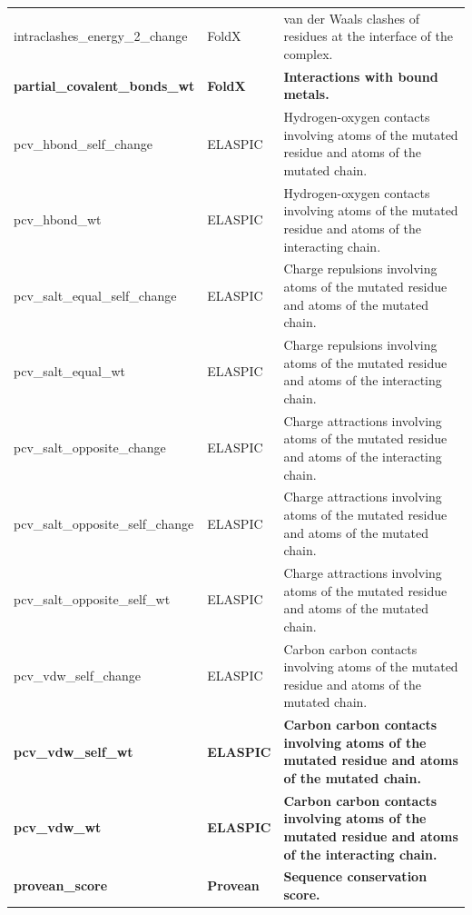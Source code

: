 \begin{table}[tb]
\begin{tabular}{ l | l | p{8cm} }
		intraclashes\_energy\_2\_change       & FoldX            & van der Waals clashes of residues at the interface of the complex.                                         \\
		\textbf{partial\_covalent\_bonds\_wt} & \textbf{FoldX}   & \textbf{Interactions with bound metals.}                                                                   \\
		pcv\_hbond\_self\_change              & ELASPIC          & Hydrogen-oxygen contacts involving atoms of the mutated residue and atoms of the mutated chain.            \\
		pcv\_hbond\_wt                        & ELASPIC          & Hydrogen-oxygen contacts involving atoms of the mutated residue and atoms of the interacting chain.        \\
		pcv\_salt\_equal\_self\_change        & ELASPIC          & Charge repulsions involving atoms of the mutated residue and atoms of the mutated chain.                   \\
		pcv\_salt\_equal\_wt                  & ELASPIC          & Charge repulsions involving atoms of the mutated residue and atoms of the interacting chain.               \\
		pcv\_salt\_opposite\_change           & ELASPIC          & Charge attractions involving atoms of the mutated residue and atoms of the interacting chain.              \\
		pcv\_salt\_opposite\_self\_change     & ELASPIC          & Charge attractions involving atoms of the mutated residue and atoms of the mutated chain.                  \\
		pcv\_salt\_opposite\_self\_wt         & ELASPIC          & Charge attractions involving atoms of the mutated residue and atoms of the mutated chain.                  \\
		pcv\_vdw\_self\_change                & ELASPIC          & Carbon carbon contacts involving atoms of the mutated residue and atoms of the mutated chain.              \\
		\textbf{pcv\_vdw\_self\_wt}           & \textbf{ELASPIC} & \textbf{Carbon carbon contacts involving atoms of the mutated residue and atoms of the mutated chain.}     \\
		\textbf{pcv\_vdw\_wt}                 & \textbf{ELASPIC} & \textbf{Carbon carbon contacts involving atoms of the mutated residue and atoms of the interacting chain.} \\
		\textbf{provean\_score}               & \textbf{Provean} & \textbf{Sequence conservation score.}                                                                      \\

\end{tabular}
\end{table}
